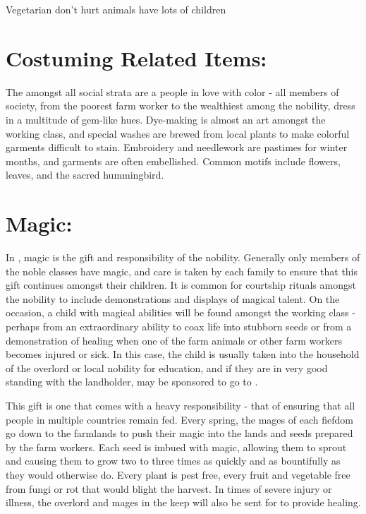 \documentclass[blue]{GL2020}
\begin{document}

Vegetarian
don't hurt animals
have lots of children

\section*{Costuming Related Items:}

The \pFarm{} amongst all social strata are a people in love with color - all members of society, from the poorest farm worker to the wealthiest among the nobility, dress in a multitude of gem-like hues.  Dye-making is almost an art amongst the working class, and special washes are brewed from local plants to make colorful garments difficult to stain.  Embroidery and needlework are pastimes for winter months, and garments are often embellished.  Common motifs include flowers, leaves, and the sacred hummingbird.

\section*{Magic:}

In \pFarm{}, magic is the gift and responsibility of the nobility. Generally only members of the noble classes have magic, and care is taken by each family to ensure that this gift continues amongst their children.  It is common for courtship rituals amongst the nobility to include demonstrations and displays of magical talent.  On the occasion, a child with magical abilities will be found amongst the working class - perhaps from an extraordinary ability to coax life into stubborn seeds or from a demonstration of healing when one of the farm animals or other farm workers becomes injured or sick.  In this case, the child is usually taken into the household of the overlord or local nobility for education, and if they are in very good standing with the landholder, may be sponsored to go to \pSchool{}.

This gift is one that comes with a heavy responsibility - that of ensuring that all people in multiple countries remain fed.  Every spring, the mages of each fiefdom go down to the farmlands to push their magic into the lands and seeds prepared by the farm workers.  Each seed is imbued with magic, allowing them to sprout and causing them to grow two to three times as quickly and as bountifully as they would otherwise do.  Every plant is pest free, every fruit and vegetable free from fungi or rot that would blight the harvest.  In times of severe injury or illness, the overlord and mages in the keep will also be sent for to provide healing.   
\end{document}
